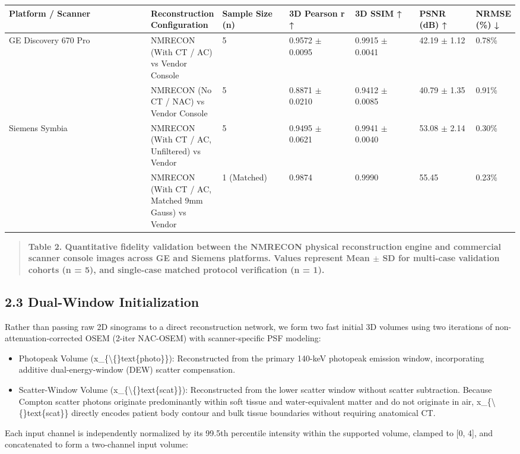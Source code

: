 \documentclass[11pt]{article}
\begin{document}
\begingroup\small\setlength{\tabcolsep}{3pt}\begin{longtable}{p{0.32\linewidth}p{0.14\linewidth}p{0.14\linewidth}p{0.14\linewidth}p{0.14\linewidth}p{0.14\linewidth}p{0.14\linewidth}}
\toprule
Platform / Scanner & Reconstruction Configuration & Sample Size (n) & 3D Pearson r ↑ & 3D SSIM ↑ & PSNR (dB) ↑ & NRMSE (\%) ↓ \\
\midrule
GE Discovery 670 Pro & NMRECON (With CT / AC) vs Vendor Console & 5 & 0.9572 $\pm$ 0.0095 & 0.9915 $\pm$ 0.0041 & 42.19 $\pm$ 1.12 & 0.78\% \\
 & NMRECON (No CT / NAC) vs Vendor Console & 5 & 0.8871 $\pm$ 0.0210 & 0.9412 $\pm$ 0.0085 & 40.79 $\pm$ 1.35 & 0.91\% \\
Siemens Symbia & NMRECON (With CT / AC, Unfiltered) vs Vendor & 5 & 0.9495 $\pm$ 0.0621 & 0.9941 $\pm$ 0.0040 & 53.08 $\pm$ 2.14 & 0.30\% \\
 & NMRECON (With CT / AC, Matched 9mm Gauss) vs Vendor & 1 (Matched) & 0.9874 & 0.9990 & 55.45 & 0.23\% \\
\bottomrule
\end{longtable}\endgroup
\begin{quote}\small\textbf{Table 2. Quantitative fidelity validation between the NMRECON physical reconstruction engine and commercial scanner console images across GE and Siemens platforms. Values represent Mean $\pm$ SD for multi-case validation cohorts (n = 5), and single-case matched protocol verification (n = 1).}\end{quote}
\subsection*{2.3 Dual-Window Initialization}
Rather than passing raw 2D sinograms to a direct reconstruction network, we form two fast initial 3D volumes using two iterations of non-attenuation-corrected OSEM (2-iter NAC-OSEM) with scanner-specific PSF modeling:\par

\begin{itemize}\item  Photopeak Volume (x\_\{\textbackslash\{\}text\{photo\}\}): Reconstructed from the primary 140-keV photopeak emission window, incorporating additive dual-energy-window (DEW) scatter compensation.\end{itemize}
\begin{itemize}\item  Scatter-Window Volume (x\_\{\textbackslash\{\}text\{scat\}\}): Reconstructed from the lower scatter window without scatter subtraction. Because Compton scatter photons originate predominantly within soft tissue and water-equivalent matter and do not originate in air, x\_\{\textbackslash\{\}text\{scat\}\} directly encodes patient body contour and bulk tissue boundaries without requiring anatomical CT.\end{itemize}
Each input channel is independently normalized by its 99.5th percentile intensity within the supported volume, clamped to [0, 4], and concatenated to form a two-channel input volume:\par
\end{document}
